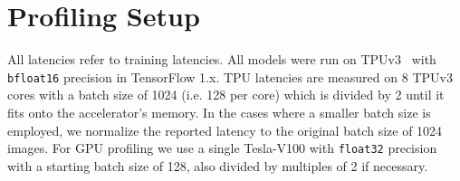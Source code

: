 \documentclass{article}
\begin{document}
\section{Profiling Setup\label{sec:profiling}}
All latencies refer to training latencies.
All models were run on TPUv3~\cite{jouppi2017datacenter} with \texttt{bfloat16} precision in TensorFlow 1.x.
TPU latencies are measured on 8 TPUv3 cores with a batch size of 1024 (i.e. 128 per core) which is divided by 2 until it fits onto the accelerator's memory.
In the cases where a smaller batch size is employed, we normalize the reported latency to the original batch size of 1024 images.
For GPU profiling we use a single Tesla-V100 with \texttt{float32} precision with a starting batch size of 128, also divided by multiples of 2 if necessary. 
\end{document}
